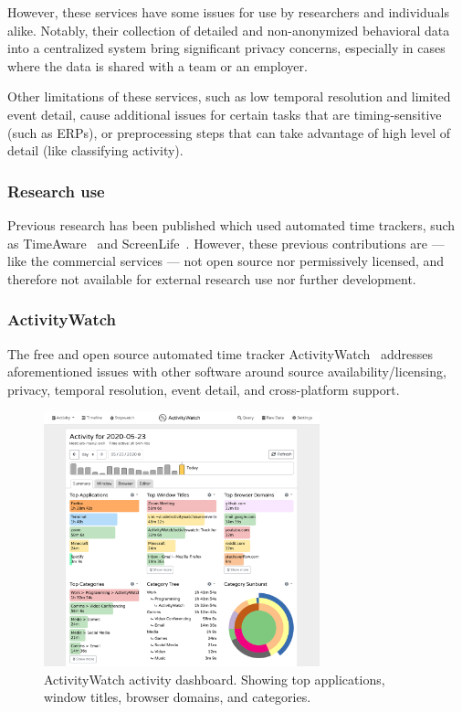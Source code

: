 \documentclass{IEEEtran}
\begin{document}
\begin{refsection}
However, these services have some issues for use by researchers and individuals alike. Notably, their collection of detailed and non-anonymized behavioral data into a centralized system bring significant privacy concerns, especially in cases where the data is shared with a team or an employer.

Other limitations of these services, such as low temporal resolution and limited event detail, cause additional issues for certain tasks that are timing-sensitive (such as ERPs), or preprocessing steps that can take advantage of high level of detail (like classifying activity).

\subsubsection{Research use}

Previous research has been published which used automated time trackers, such as TimeAware~\cite{kim_timeaware_2016} and ScreenLife~\cite{rooksby_personal_2016}. However, these previous contributions are --- like the commercial services --- not open source nor permissively licensed, and therefore not available for external research use nor further development.

\subsubsection{ActivityWatch}

The free and open source automated time tracker ActivityWatch~\cite{bjareholt_activitywatch_2020} addresses aforementioned issues with other software around source availability/licensing, privacy, temporal resolution, event detail, and cross-platform support.

\begin{figure}[h]
\centering
\includegraphics[width=8cm]{img/screenshot-aw-activity.png}
\caption{ActivityWatch activity dashboard. Showing top applications, window titles, browser domains, and categories.}\label{fig:aw}
\end{figure}


\end{refsection}
\end{document}
